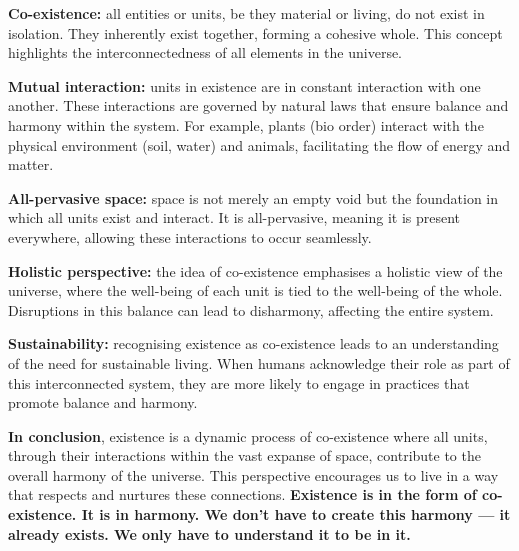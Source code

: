 \begin{apts}
\item \textbf{Co-existence:} all entities or units, be they material or
      living, do not exist in isolation. They inherently exist together,
      forming a cohesive whole. This concept highlights the interconnectedness
      of all elements in the universe.
\item \textbf{Mutual interaction:} units in existence are in constant
      interaction with one another. These interactions are governed by natural
      laws that ensure balance and harmony within the system. For example,
      plants (bio order) interact with the physical environment (soil, water)
      and animals, facilitating the flow of energy and matter.
\item \textbf{All-pervasive space:} space is not merely an empty void but the
      foundation in which all units exist and interact. It is all-pervasive,
      meaning it is present everywhere, allowing these interactions to occur
      seamlessly.
\item \textbf{Holistic perspective:} the idea of co-existence emphasises a
      holistic view of the universe, where the well-being of each unit is tied
      to the well-being of the whole. Disruptions in this balance can lead to
      disharmony, affecting the entire system.
\item \textbf{Sustainability:} recognising existence as co-existence leads to
      an understanding of the need for sustainable living. When humans
      acknowledge their role as part of this interconnected system, they are
      more likely to engage in practices that promote balance and harmony.
\end{apts}

\textbf{In conclusion}, existence is a dynamic process of co-existence where
all units, through their interactions within the vast expanse of space,
contribute to the overall harmony of the universe. This perspective encourages
us to live in a way that respects and nurtures these connections.
\textbf{Existence is in the form of co-existence. It is in harmony. We don't
have to create this harmony --- it already exists. We only have to understand
it to be in it.}

%
  {}

